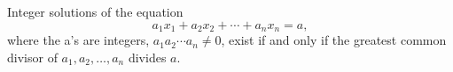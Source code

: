 \begin{proposition}
    Integer solutions of the equation
\[
    a_1 x_1 + a_2x_2 + \cdots + a_n x_n = a,
\]
where the a's are integers, $a_1a_2 \cdots a_n \neq 0$, exist if and only if
the greatest common divisor of $a_1, a_2, \ldots, a_n$ divides $a$.
\end{proposition}
